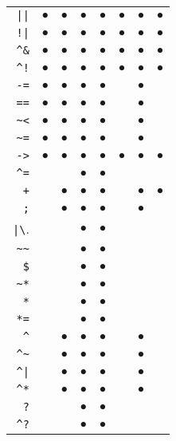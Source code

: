 \begin{longtable}{rrrrrrrr}
\verb.||. & $\bullet$ & $\bullet$ & $\bullet$ & $\bullet$ & $\bullet$ & $\bullet$ & $\bullet$\\
\verb.!|. & $\bullet$ & $\bullet$ & $\bullet$ & $\bullet$ & $\bullet$ & $\bullet$ & $\bullet$\\
\verb.^&. & $\bullet$ & $\bullet$ & $\bullet$ & $\bullet$ & $\bullet$ & $\bullet$ & $\bullet$\\
\verb.^!. & $\bullet$ & $\bullet$ & $\bullet$ & $\bullet$ & $\bullet$ & $\bullet$ & $\bullet$\\
\verb.-=. & $\bullet$ & $\bullet$ & $\bullet$ & $\bullet$ &  & $\bullet$ & \\
\verb.==. & $\bullet$ & $\bullet$ & $\bullet$ & $\bullet$ &  & $\bullet$ & \\
\verb.~<. & $\bullet$ & $\bullet$ & $\bullet$ & $\bullet$ &  & $\bullet$ & \\
\verb.~=. & $\bullet$ & $\bullet$ & $\bullet$ & $\bullet$ &  & $\bullet$ & \\
\verb.->. & $\bullet$ & $\bullet$ & $\bullet$ & $\bullet$ & $\bullet$ & $\bullet$ & $\bullet$\\
\verb.^=. &  &  & $\bullet$ & $\bullet$ &  &  & \\
\verb.+. &  & $\bullet$ & $\bullet$ & $\bullet$ &  & $\bullet$ & $\bullet$\\
\verb.;. &  & $\bullet$ & $\bullet$ & $\bullet$ &  & $\bullet$ & \\
\verb.|\. &  &  & $\bullet$ & $\bullet$ &  &  & \\
\verb.~~. &  &  & $\bullet$ & $\bullet$ &  &  & \\
\verb.$. &  &  & $\bullet$ & $\bullet$ &  &  & \\
\verb.~*. &  &  & $\bullet$ & $\bullet$ &  &  & \\
\verb.*. &  &  & $\bullet$ & $\bullet$ &  &  & \\
\verb.*=. &  &  & $\bullet$ & $\bullet$ &  &  & \\
\verb.^. &  & $\bullet$ & $\bullet$ & $\bullet$ &  & $\bullet$ & \\
\verb.^~. &  & $\bullet$ & $\bullet$ & $\bullet$ &  & $\bullet$ & \\
\verb.^|. &  & $\bullet$ & $\bullet$ & $\bullet$ &  & $\bullet$ & \\
\verb.^*. &  & $\bullet$ & $\bullet$ & $\bullet$ &  & $\bullet$ & \\
\verb.?. &  &  & $\bullet$ & $\bullet$ &  &  & \\
\verb.^?. &  &  & $\bullet$ & $\bullet$ &  &  & \\

\end{longtable}
